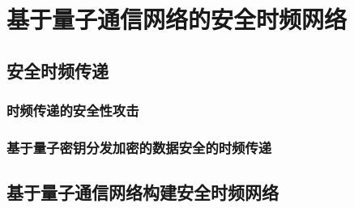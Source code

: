 \chapter{基于量子通信网络的安全时频网络}

\section{安全时频传递}
\subsection{时频传递的安全性攻击}
\subsection{基于量子密钥分发加密的数据安全的时频传递}

\section{基于量子通信网络构建安全时频网络}
